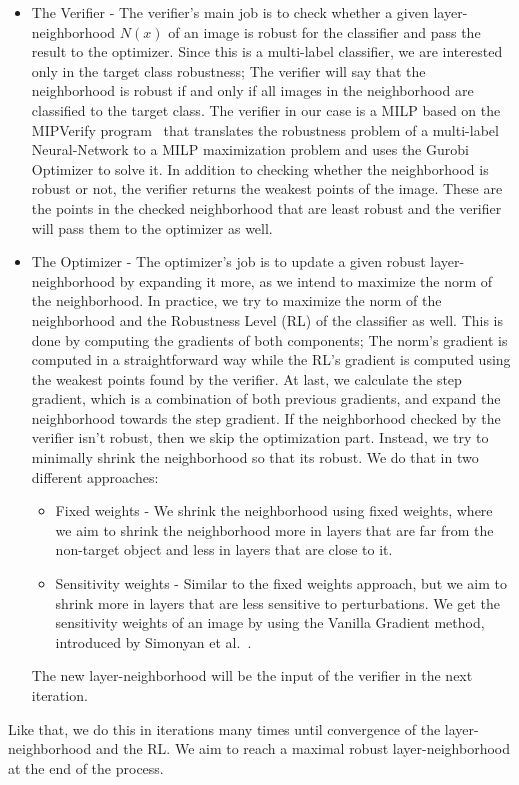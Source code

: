 \documentclass[11pt]{article}
\begin{document}
\begin{itemize}
    \item The Verifier - The verifier's main job is to check whether a given layer-neighborhood $N(x)$ of an image is robust for the classifier and pass the result to the optimizer.
    Since this is a multi-label classifier, we are interested only in the target class robustness;
    The verifier will say that the neighborhood is robust if and only if all images in the neighborhood are classified to the target class.
    The verifier in our case is a MILP based on the MIPVerify program~\cite{MIPVERIFY} that translates the robustness problem of a multi-label Neural-Network to a MILP maximization problem and uses the Gurobi Optimizer to solve it.
    In addition to checking whether the neighborhood is robust or not, the verifier returns the weakest points of the image.
    These are the points in the checked neighborhood that are least robust and the verifier will pass them to the optimizer as well.
    \item The Optimizer - The optimizer's job is to update a given robust layer-neighborhood by expanding it more, as we intend to maximize the norm of the neighborhood.
    In practice, we try to maximize the norm of the neighborhood and the Robustness Level (RL) of the classifier as well.
    This is done by computing the gradients of both components;
    The norm's gradient is computed in a straightforward way while the RL's gradient is computed using the weakest points found by the verifier.
    At last, we calculate the step gradient, which is a combination of both previous gradients, and expand the neighborhood towards the step gradient.
    If the neighborhood checked by the verifier isn't robust, then we skip the optimization part.
    Instead, we try to minimally shrink the neighborhood so that its robust.
    We do that in two different approaches:
    \begin{itemize}
        \item Fixed weights - We shrink the neighborhood using fixed weights, where we aim to shrink the neighborhood more in layers that are far from the non-target object and less in layers that are close to it.
        \item Sensitivity weights - Similar to the fixed weights approach, but we aim to shrink more in layers that are less sensitive to perturbations.
        We get the sensitivity weights of an image by using the Vanilla Gradient method, introduced by Simonyan et al.~\cite{VANILLAGRADIENT}.
    \end{itemize}
    The new layer-neighborhood will be the input of the verifier in the next iteration.
\end{itemize}
Like that, we do this in iterations many times until convergence of the layer-neighborhood and the RL\@.
We aim to reach a maximal robust layer-neighborhood at the end of the process.
\end{document}

